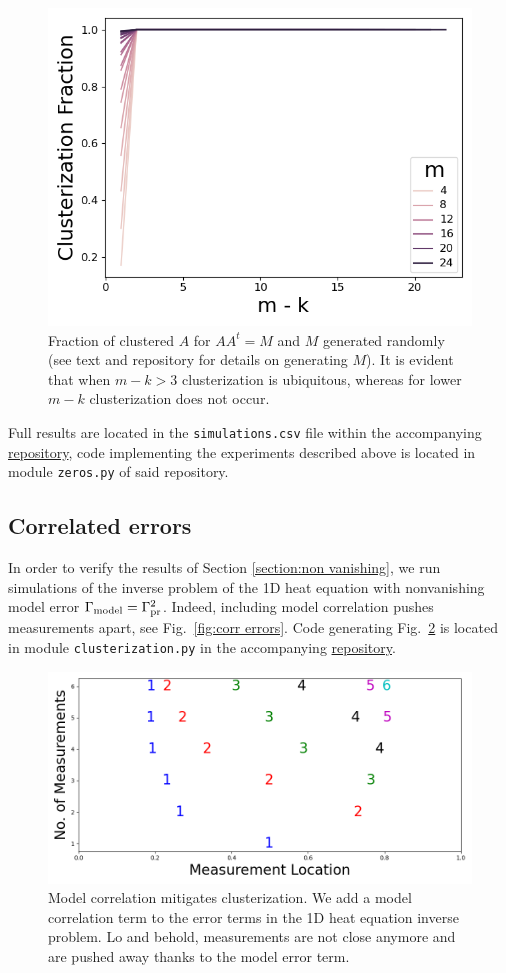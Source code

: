 \begin{figure}
    \centering
    \includegraphics[height=0.5\textwidth]{simulations.png}
    \caption{Fraction of clustered $A$ for $AA^t = M$ and $M$
      generated randomly (see text and repository for details on
      generating $M$). It is evident that when $m-k >3$ clusterization
      is ubiquitous, whereas for lower $m-k$ clusterization does not
      occur.}
  \label{fig:sim AAt}
\end{figure}

Full results are located in the \texttt{simulations.csv} file within
the accompanying \href{https://github.com/yairdaon/OED}{repository},
code implementing the experiments described above is located in module
\texttt{zeros.py} of said repository.


\subsection{Correlated errors}\label{subsec:corr errors sims}
In order to verify the results of Section \ref{section:non vanishing},
we run simulations of the inverse problem of the 1D heat equation with
nonvanishing model error \(\Gamma_{\textup{model}} = \Gamma_{\textup{pr}}^2 \). Indeed, including
model correlation pushes measurements apart, see Fig.~\ref{fig:corr
  errors}. Code generating Fig.~\ref{fig:corr errors} is located in
module \texttt{clusterization.py} in the accompanying
\href{https://github.com/yairdaon/OED}{repository}.

\begin{figure}
    \centering
    \includegraphics[height=0.5\textwidth]{dst_modelError4.png}
    \caption{Model correlation mitigates clusterization. We add a
      model correlation term to the error terms in the 1D heat
      equation inverse problem. Lo and behold, measurements are not
      close anymore and are pushed away thanks to the model error
      term.}
  \label{fig:corr errors}
\end{figure}
